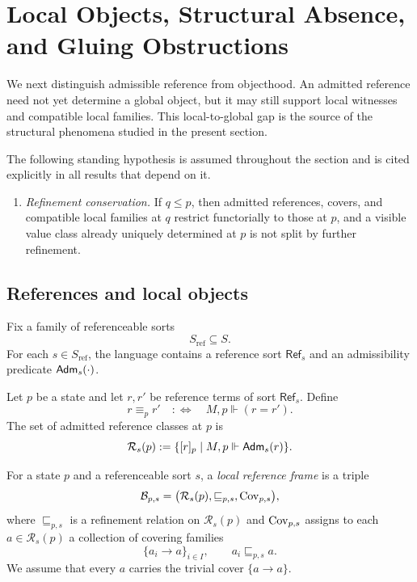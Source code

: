 \section{Local Objects, Structural Absence, and Gluing Obstructions}\label{sec:null-decomposition}

We next distinguish admissible reference from objecthood. An admitted reference need not yet determine a global object, but it may still support local witnesses and compatible local families. This local-to-global gap is the source of the structural phenomena studied in the present section.

The following standing hypothesis is assumed throughout the section and is cited explicitly in all results that depend on it.

\begin{enumerate}[label=\textup{(RC)},nosep,leftmargin=3em]
\item\label{hyp:refinement-conservation} \emph{Refinement conservation.} If $q\le p$, then admitted references, covers, and compatible local families at $q$ restrict functorially to those at $p$, and a visible value class already uniquely determined at $p$ is not split by further refinement.
\end{enumerate}

\subsection{References and local objects}

Fix a family of referenceable sorts
\[
S_{\mathrm{ref}}\subseteq S.
\]
For each $s\in S_{\mathrm{ref}}$, the language contains a reference sort $\mathsf{Ref}_s$ and an admissibility predicate $\mathsf{Adm}_s(\cdot)$.

\begin{definition}\label{def:reference-classes}
Let $p$ be a state and let $r,r'$ be reference terms of sort $\mathsf{Ref}_s$. Define
\[
r\equiv_p r'
\quad:\Longleftrightarrow\quad
M,p\Vdash (r=r').
\]
The set of admitted reference classes at $p$ is
\[
\mathcal{R}_s(p):=\{[r]_p\mid M,p\Vdash \mathsf{Adm}_s(r)\}.
\]
\end{definition}

\begin{definition}\label{def:local-reference-frame}
For a state $p$ and a referenceable sort $s$, a \emph{local reference frame} is a triple
\[
\mathcal{B}_{p,s}=\bigl(\mathcal{R}_s(p),\sqsubseteq_{p,s},\mathrm{Cov}_{p,s}\bigr),
\]
where $\sqsubseteq_{p,s}$ is a refinement relation on $\mathcal{R}_s(p)$ and $\mathrm{Cov}_{p,s}$ assigns to each $a\in\mathcal{R}_s(p)$ a collection of covering families
\[
\{a_i\to a\}_{i\in I},
\qquad
a_i\sqsubseteq_{p,s} a.
\]
We assume that every $a$ carries the trivial cover $\{a\to a\}$.
\end{definition}

